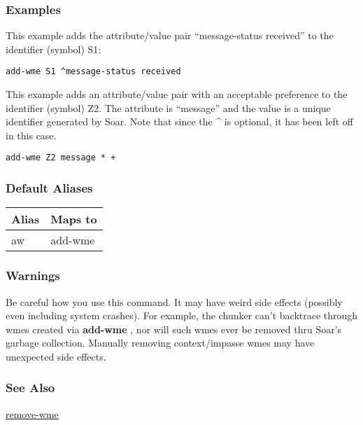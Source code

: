 \subsubsection*{Examples}
 This example adds the attribute/value pair ``message-status received'' to the identifier (symbol) S1: \begin{verbatim}
add-wme S1 ^message-status received
\end{verbatim}
 This example adds an attribute/value pair with an acceptable preference to the identifier (symbol) Z2. The attribute is ``message'' and the value is a unique identifier generated by Soar. Note that since the \^{} is optional, it has been left off in this case. \begin{verbatim}
add-wme Z2 message * +
\end{verbatim}
\subsubsection*{Default Aliases}
\begin{tabular}{|l|l|}
\hline 
 Alias  & Maps to  \\
 \hline 
 aw  & add-wme  \\
 \hline 
\end{tabular}
\subsubsection*{Warnings}
 Be careful how you use this command. It may have weird side effects (possibly even including system crashes). For example, the chunker can't backtrace through wmes created via \textbf{add-wme}
, nor will such wmes ever be removed thru Soar's garbage collection. Manually removing context/impasse wmes may have unexpected side effects. 
\subsubsection*{See Also}
\hyperref[remove-wme]{remove-wme} 